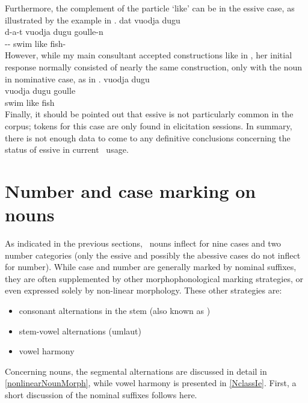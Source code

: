 Furthermore, the complement of the particle  ‘like’ can be in the essive case, as illustrated by the example in . 
\ea\label{ess3}
\glll	dat vuodja dugu \\
	d-a-t vuodja dugu goulle-n\\
	-- swim\BS{} like fish-\\\nopagebreak
{} 
\z
However, while my main consultant accepted constructions like in , her initial response normally consisted of nearly the same construction, only with the noun in nominative case, as in . 
\ea\label{ess4}
\glll	vuodja dugu \\
	vuodja dugu goulle\\
	swim\BS{} like fish\BS{}\\\nopagebreak
{} 
\z
Finally, it should be pointed out that essive is not particularly common in the corpus; tokens for this case are only found in elicitation sessions. In summary, there is not enough data to come to any definitive conclusions concerning the status of essive in current \PS\ usage. 


\section{Number and case marking on nouns}\label{NumCaseNouns}
As indicated in the previous sections, \PS\ nouns inflect for nine cases and two number categories (only the essive and possibly the abessive cases do not inflect for number). While case and number are generally marked by nominal suffixes, they are often supplemented by other morphophonological marking strategies, or even expressed solely by non-linear morphology. These other strategies are: 
\begin{itemize}
\item{consonant alternations in the stem (also known as )}
\item{stem-vowel alternations (umlaut)}
\item{vowel harmony}
\end{itemize} %
Concerning nouns, the segmental alternations are discussed in detail in \SEC\ref{nonlinearNounMorph}, while vowel harmony is presented in \SEC\ref{NclassIe}. First, a short discussion of the nominal suffixes follows here.


